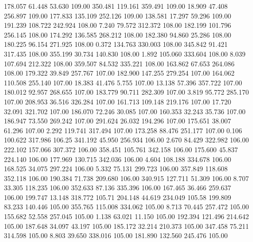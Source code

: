  178.057   61.448   53.630       109.00
 350.481  119.161  359.491       109.00
  18.909   47.408  256.897       109.00
 177.833  135.109  252.126       109.00
 138.581   17.297   59.296       109.00
 191.239  108.722  242.924       108.00
   7.240   79.572  312.372       108.00
 182.199  101.796  256.145       108.00
 174.292  136.585  268.212       108.00
 182.380   94.860   25.286       108.00
 180.225   96.154  271.925       108.00
   0.372  134.763  330.003       108.00
 345.842   91.421  317.435       108.00
 355.199   30.734  140.830       108.00
   1.892  105.060  333.604       108.00
   8.039  107.694  212.322       108.00
 359.507   84.532  335.221       108.00
 163.862   67.653  264.086       108.00
 179.322   39.849  257.767       107.00
 182.900  147.255  279.254       107.00
 164.062  110.508  255.140       107.00
  18.383   41.476    5.755       107.00
  13.138   57.396  357.722       107.00
 180.012   92.957  268.655       107.00
 183.779   90.711  282.309       107.00
   3.819   95.772  285.170       107.00
 208.953   36.516  326.284       107.00
 161.713  109.148  219.176       107.00
  17.720   32.091  321.702       107.00
 186.070   72.246   30.085       107.00
 160.353   32.243   35.736       107.00
 186.947   73.550  269.242       107.00
 291.624   26.032  194.296       107.00
 175.651   38.007   61.296       107.00
   2.292  119.741  317.494       107.00
 173.258   88.476  251.177       107.00
   0.106  100.622  317.986       106.25
 341.192   45.950  256.934       106.00
   2.670   84.429  322.982       106.00
 222.102  157.066  307.372       106.00
 358.451  105.761  342.158       106.00
 175.600   45.837  224.140       106.00
 177.969  130.715  342.036       106.00
   4.604  108.188  334.678       106.00
 168.525   34.075  297.224       106.00
   5.332   75.131  299.723       106.00
 357.849  118.608  352.118       106.00
 190.384   71.738  209.680       106.00
 340.915  127.711   51.309       106.00
   8.707   33.305  118.235       106.00
 352.633   87.136  335.396       106.00
 167.465   36.466  259.637       106.00
 199.747   13.148  318.772       105.71
 204.148   44.619  234.049       105.58
 199.809   83.233  140.446       105.00
 355.765  115.008  334.062       105.00
   8.713   70.445  257.472       105.00
 155.682   52.558  257.045       105.00
   1.138   63.021   11.150       105.00
 192.394  121.496  214.642       105.00
 187.648   34.097   43.197       105.00
 185.172   32.214  210.373       105.00
 347.458   75.211  314.598       105.00
   8.803   39.650  338.016       105.00
 181.890  132.560  245.476       105.00
